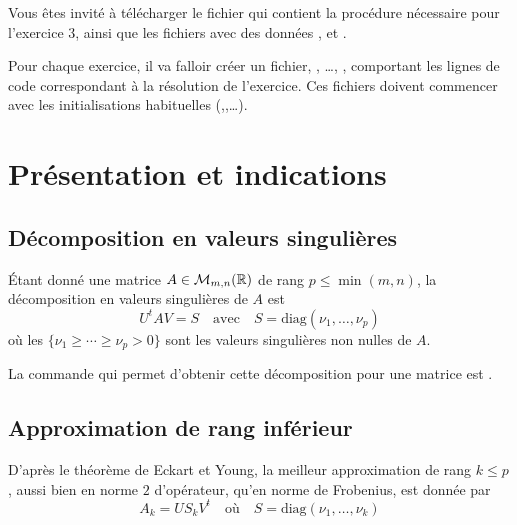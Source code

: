 \documentclass[a4paper,12pt,reqno]{amsart}
\begin{document}

Vous êtes invité à télécharger le fichier  qui contient la procédure  nécessaire pour l'exercice 3, ainsi que les fichiers avec des données ,  et .

Pour chaque exercice, il va falloir créer un fichier, , \dots, , comportant les lignes de code correspondant à la résolution de l'exercice. Ces fichiers doivent commencer avec les initialisations habituelles (,,\dots).\\[1ex]

\section{Présentation et indications}

\subsection*{Décomposition en valeurs singulières}

Étant donné une matrice $A\in{\mathcal M}_{m,n}(\mathbb{R})$ de rang $p\leq \min (m,n)$, la décomposition en valeurs singulières de $A$ est
  $$
    U^tAV = S \quad\text{avec}\quad S = \mbox{diag} (\nu_1, \ldots , \nu_p )
  $$
où les $\{\nu_1 \geq \cdots \geq \nu_p > 0\}$ sont les valeurs singulières non nulles de $A$.

La commande  qui permet d'obtenir cette décomposition pour une matrice  est .

\subsection*{Approximation de rang inférieur}

D'après le théorème de Eckart et Young, la meilleur approximation de rang $k \leq p$, aussi bien en norme $2$ d'opérateur, qu'en norme de Frobenius, est donnée par
  $$
    A_{k} = US_{k}V^{t} \quad\text{où}\quad S = \mbox{diag} (\nu_1, \ldots , \nu_k )
  $$
\end{document}
